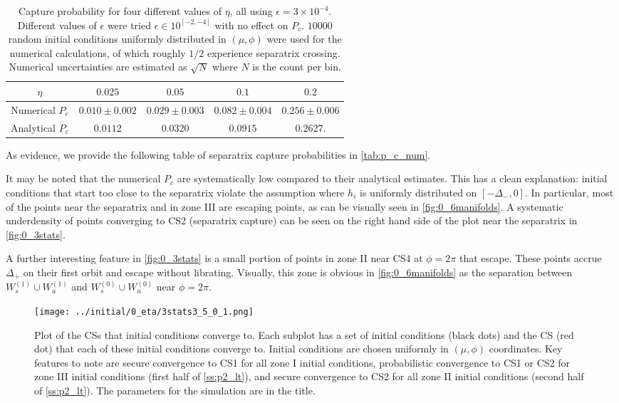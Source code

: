 \documentclass[
        fleqn,
        usenatbib,
    ]{mnras}
\begin{document}
\begin{table*}
    \centering
    \begin{tabular}{c|c c c c}
        $\eta$ & $0.025$ & $0.05$ & $0.1$ & $0.2$\\\midrule
        Numerical $P_c$ & $0.010 \pm 0.002$ & $0.029 \pm 0.003$
            & $0.082 \pm 0.004$ & $0.256 \pm 0.006$ \\
        Analytical $P_c$ & $0.0112$ & $0.0320$ & $0.0915$ & $0.2627$.
    \end{tabular}
    \caption{Capture probability for four different values of $\eta$, all using
    $\epsilon = 3 \times 10^{-4}$. Different values of $\epsilon$ were tried
    $\epsilon \in 10^{[-2, -4]}$ with no effect on $P_c$. $10000$ random initial
    conditions uniformly distributed in $(\mu, \phi)$ were used for the
    numerical calculations, of which roughly $1/2$ experience separatrix
    crossing. Numerical uncertainties are estimated as $\sqrt{N}$ where $N$ is
    the count per bin.}\label{tab:p_c_num}
\end{table*}
As evidence, we provide the following table of separatrix capture probabilities
in \autoref{tab:p_c_num}.

It may be noted that the numerical $P_c$ are systematically low compared to
their analytical estimates. This has a clean explanation: initial conditions
that start too close to the separatrix violate the assumption where $h_i$ is
uniformly distributed on $[-\Delta_-, 0]$. In particular, most of the points
near the separatrix and in zone III are escaping points, as can be visually seen
in \autoref{fig:0_6manifolds}. A systematic underdensity of points converging to
CS2 (separatrix capture) can be seen on the right hand side of the plot near the
separatrix in \autoref{fig:0_3stats}.

A further interesting feature in \autoref{fig:0_3stats} is a small portion of
points in zone II near CS4  at $\phi = 2\pi$ that escape. These points accrue
$\Delta_+$ on their first orbit and escape without librating. Visually, this
zone is obvious in \autoref{fig:0_6manifolds} as the separation between
$W_s^{(1)} \cup W_u^{(1)}$ and $W_s^{(0)} \cup W_u^{(0)}$ near $\phi = 2\pi$.
\begin{figure}
    \centering
    \texttt{[image: ../initial/0\_eta/3stats3\_5\_0\_1.png]}
    \caption{Plot of the CSs that initial conditions converge to. Each subplot
    has a set of initial conditions (black dots) and the CS (red dot) that each
    of these initial conditions converge to. Initial conditions are chosen
    uniformly in $(\mu, \phi)$ coordinates. Key features to note are secure
    convergence to CS1 for all zone I initial conditions, probabilistic
    convergence to CS1 or CS2 for zone III initial conditions (first half of
    \autoref{ss:p2_lt}), and secure convergence to CS2 for all zone II initial
    conditions (second half of \autoref{ss:p2_lt}). The parameters for the
    simulation are in the title.}\label{fig:0_3stats}
\end{figure}
\end{document}

